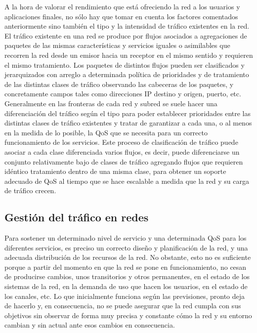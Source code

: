 A la hora de valorar el rendimiento que está ofreciendo la red a los usuarios y aplicaciones finales, no sólo hay que tomar en cuenta los factores comentados anteriormente sino también el tipo y la intensidad de tráfico existentes en la red. El tráfico existente en una red se produce por flujos asociados a agregaciones de paquetes de las mismas características y servicios iguales o asimilables que recorren la red desde un emisor hacia un receptor en el mismo sentido y requieren el mismo tratamiento. Los paquetes de distintos flujos pueden ser clasificados y jerarquizados con arreglo a determinada política de prioridades y de tratamiento de las distintas clases de tráfico observando las cabeceras de los paquetes, y concretamente campos tales como direcciones IP destino y origen, puerto, etc.\\

Generalmente en las fronteras de cada red y subred se suele hacer una diferenciación del tráfico según el tipo para poder establecer prioridades entre las distintas clases de tráfico existentes y tratar de garantizar a cada una, o al menos en la medida de lo posible, la QoS que se necesita para un correcto funcionamiento de los servicios. Este proceso de clasificación de tráfico puede asociar a cada clase diferenciada varios flujos, es decir, puede diferenciarse un conjunto relativamente bajo de clases de tráfico agregando flujos que requieren idéntico tratamiento dentro de una misma clase, para obtener un soporte adecuado de QoS al tiempo que se hace escalable a medida que la red y su carga de tráfico crecen. 

\subsection{Gestión del tráfico en redes}
Para sostener un determinado nivel de servicio y una determinada QoS para los diferentes servicios, es preciso un correcto diseño y planificación de la red, y una adecuada distribución de los recursos de la red. No obstante, esto no es suficiente porque a partir del momento en que la red se pone en funcionamiento, no cesan de producirse cambios, unos transitorios y otros permanentes, en el estado de los sistemas de la red, en la demanda de uso que hacen los usuarios, en el estado de los canales, etc. Lo que inicialmente funciona según las previsiones, pronto deja de hacerlo y, en consecuencia, no se puede asegurar que la red cumpla con sus objetivos sin observar de forma muy precisa y constante cómo la red y su entorno cambian y sin actual ante esos cambios en consecuencia.\\

